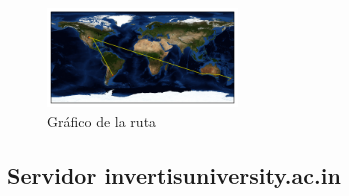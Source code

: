\begin{figure}[H]
  \centering
    \includegraphics[width=0.45\textwidth]{grafico-rutas/auckland-ac-nz.png}
  \caption{Gráfico de la ruta}
  \label{entropia-s}
\end{figure}




\subsection{Servidor invertisuniversity.ac.in}


